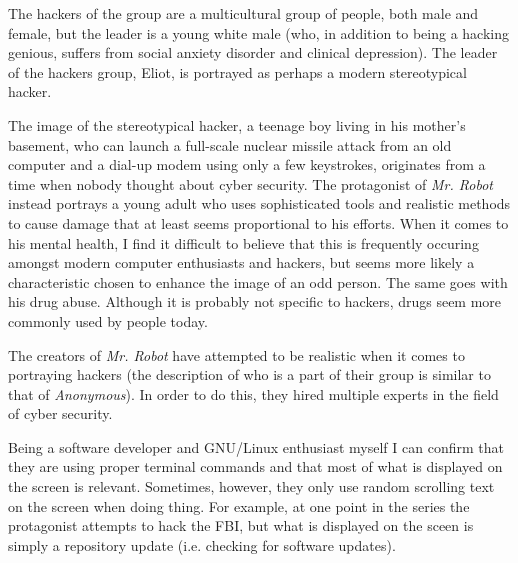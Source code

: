 \documentclass[12pt,a4paper]{IEEEtran}
\begin{document}
The hackers of the group are a multicultural group of people, both male and female, but the leader is a young white male (who, in addition to being a hacking genious, suffers from social anxiety disorder and clinical depression).
The leader of the hackers group, Eliot, is portrayed as perhaps a modern stereotypical hacker.

The image of the stereotypical hacker, a teenage boy living in his mother's basement, who can launch a full-scale nuclear missile attack from an old computer and a dial-up modem using only a few keystrokes, originates from a time when nobody thought about cyber security.
The protagonist of \textit{Mr. Robot} instead portrays a young adult who uses sophisticated tools and realistic methods to cause damage that at least seems proportional to his efforts.
When it comes to his mental health, I find it difficult to believe that this is frequently occuring amongst modern computer enthusiasts and hackers, but seems more likely a characteristic chosen to enhance the image of an odd person.
The same goes with his drug abuse. Although it is probably not specific to hackers, drugs seem more commonly used by people today.

The creators of \textit{Mr. Robot} have attempted to be realistic when it comes to portraying hackers (the description of who is a part of their group is similar to that of \textit{Anonymous}).
In order to do this, they hired multiple experts in the field of cyber security.

Being a software developer and GNU/Linux enthusiast myself I can confirm that they are using proper terminal commands and that most of what is displayed on the screen is relevant.
Sometimes, however, they only use random scrolling text on the screen when doing thing.
For example, at one point in the series the protagonist attempts to hack the FBI, but what is displayed on the sceen is simply a repository update (i.e. checking for software updates).
\end{document}
